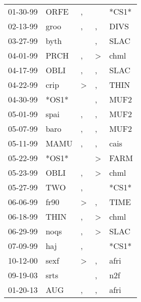 \begin{supertabular}{p{0.07\textwidth}p{0.06\textwidth}p{0.02\textwidth}p{0.02\textwidth}p{0.06\textwidth}}
 01-30-99\textsuperscript{} &  ORFE\textsuperscript{} &             , &               &                   *CS1* \\
 02-13-99\textsuperscript{} &  groo\textsuperscript{} &             , &             , &  DIVS\textsuperscript{} \\
 03-27-99\textsuperscript{} &  byth\textsuperscript{} &               &             , &  SLAC\textsuperscript{} \\
 04-01-99\textsuperscript{} &  PRCH\textsuperscript{} &             , &  \textgreater &  chml\textsuperscript{} \\
 04-17-99\textsuperscript{} &  OBLI\textsuperscript{} &             , &             , &  SLAC\textsuperscript{} \\
 04-22-99\textsuperscript{} &  crip\textsuperscript{} &  \textgreater &             , &  THIN\textsuperscript{} \\
 04-30-99\textsuperscript{} &                   *OS1* &               &             , &  MUF2\textsuperscript{} \\
 05-01-99\textsuperscript{} &  spai\textsuperscript{} &             , &             , &  MUF2\textsuperscript{} \\
 05-07-99\textsuperscript{} &  baro\textsuperscript{} &             , &             , &  MUF2\textsuperscript{} \\
 05-11-99\textsuperscript{} &  MAMU\textsuperscript{} &             , &             , &  cais\textsuperscript{} \\
 05-22-99\textsuperscript{} &                   *OS1* &               &  \textgreater &  FARM\textsuperscript{} \\
 05-23-99\textsuperscript{} &  OBLI\textsuperscript{} &             , &  \textgreater &  chml\textsuperscript{} \\
 05-27-99\textsuperscript{} &   TWO\textsuperscript{} &             , &               &                   *CS1* \\
 06-06-99\textsuperscript{} &  fr90\textsuperscript{} &  \textgreater &             , &  TIME\textsuperscript{} \\
 06-18-99\textsuperscript{} &  THIN\textsuperscript{} &             , &  \textgreater &  chml\textsuperscript{} \\
 06-29-99\textsuperscript{} &  noqs\textsuperscript{} &             , &  \textgreater &  SLAC\textsuperscript{} \\
 07-09-99\textsuperscript{} &   haj\textsuperscript{} &             , &               &                   *CS1* \\
 10-12-00\textsuperscript{} &  sexf\textsuperscript{} &  \textgreater &             , &  afri\textsuperscript{} \\
 09-19-03\textsuperscript{} &  srts\textsuperscript{} &               &             , &   n2f\textsuperscript{} \\
 01-20-13\textsuperscript{} &   AUG\textsuperscript{} &             , &             , &  afri\textsuperscript{} \\
\end{supertabular}
